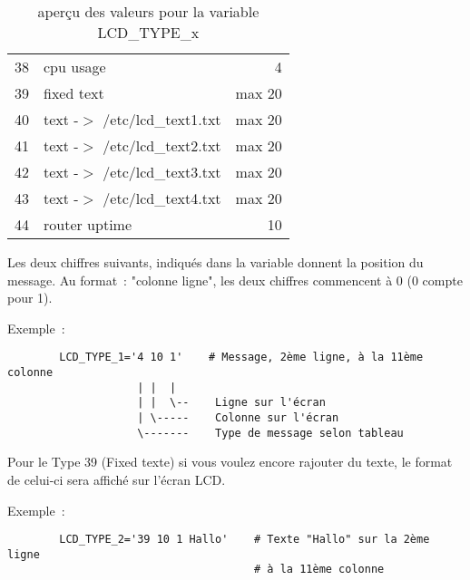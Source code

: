 \begin{description}
\begin{table}[htbp]
\begin{small}
\begin{center}
\begin{tabular}{rlr}
                38 &      cpu usage                       &  4 \\

                39 &      fixed text                  & max 20 \\
                40 &      text -$>$ /etc/lcd\_text1.txt  & max 20 \\
                41 &      text -$>$ /etc/lcd\_text2.txt  & max 20 \\
                42 &      text -$>$ /etc/lcd\_text3.txt  & max 20 \\
                43 &      text -$>$ /etc/lcd\_text4.txt  & max 20 \\

                44 &      router uptime                   & 10 \\

            \end{tabular}
            \caption{aperçu des valeurs pour la variable LCD\_TYPE\_x}
          \end{center}
          \end{small}
        \end{table}




        Les deux chiffres suivants, indiqués dans la variable 
        donnent la position du message. Au format~: "colonne ligne", les deux
        chiffres commencent à 0 (0 compte pour 1).

      Exemple~:

\begin{example}
\begin{verbatim}
        LCD_TYPE_1='4 10 1'    # Message, 2ème ligne, à la 11ème colonne
                    | |  |
                    | |  \--    Ligne sur l'écran
                    | \-----    Colonne sur l'écran
                    \-------    Type de message selon tableau
\end{verbatim}
\end{example}


        Pour le Type 39 (Fixed texte) si vous voulez encore rajouter du texte,
        le format de celui-ci sera affiché sur l'écran LCD.

      Exemple~:

\begin{example}
\begin{verbatim}
        LCD_TYPE_2='39 10 1 Hallo'    # Texte "Hallo" sur la 2ème ligne
                                      # à la 11ème colonne
\end{verbatim}
\end{example}



\end{description}
